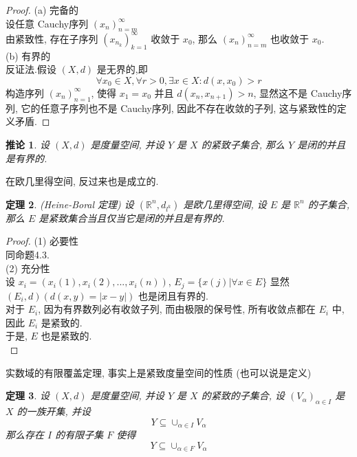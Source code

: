\documentclass[12pt, a4paper, oneside]{ctexart}
\newtheorem{theorem}{定理}[section]
\newtheorem{corollary}[theorem]{推论}
\begin{document}
\begin{proof}
    (a) 完备的\\
    设任意 Cauchy序列 $(x_n)_{n=m}^{\infty}$\\
    由紧致性, 存在子序列 $(x_{n_k})_{k=1}^{\infty}$ 收敛于 $x_0$, 那么 $(x_n)_{n=m}^{\infty}$ 也收敛于 $x_0$.\\
    (b) 有界的\\
    反证法.假设 $(X, d)$ 是无界的,即
    $$
        \forall x_0\in X, \forall r > 0,\exists x\in X:d(x, x_0)>r
    $$
    构造序列 $(x_n)_{n=1}^{\infty}$, 使得 $x_1=x_0$ 并且 $d(x_n, x_{n+1})>n$, 显然这不是 Cauchy序列, 它的任意子序列也不是 Cauchy序列, 因此不存在收敛的子列, 这与紧致性的定义矛盾.
\end{proof}

\begin{corollary}
    设 $(X, d)$ 是度量空间, 并设 $Y$ 是 $X$ 的紧致子集合, 那么 $Y$ 是闭的并且是有界的.
\end{corollary}

在欧几里得空间, 反过来也是成立的.

\begin{theorem}
    (Heine-Boral 定理) 设 $(\mathbb R^n, d_{l^k})$ 是欧几里得空间, 设 $E$ 是 $\mathbb R^n$ 的子集合, 那么 $E$ 是紧致集合当且仅当它是闭的并且是有界的. 
\end{theorem}

\begin{proof}
    (1) 必要性\\
    同命题4.3.\\
    (2) 充分性\\
    设 $x_i=(x_{i}(1),x_{i}(2),...,x_{i}(n))$, $E_j=\{x(j)|\forall x\in E\}$
    显然 $(E_i, d) (d(x,y)=|x-y|)$ 也是闭且有界的.\\
    对于 $E_i$, 因为有界数列必有收敛子列, 而由极限的保号性, 所有收敛点都在 $E_i$ 中, 因此 $E_i$ 是紧致的.\\
    于是, $E$ 也是紧致的.\\
\end{proof}

实数域的有限覆盖定理, 事实上是紧致度量空间的性质 (也可以说是定义)

\begin{theorem}
    设 $(X, d)$ 是度量空间, 并设 $Y$ 是 $X$ 的紧致的子集合, 设 $(V_{\alpha})_{\alpha\in I}$ 是 $X$ 的一族开集, 并设
    $$
        Y\subseteq \cup_{\alpha \in I} V_{\alpha}
    $$
    那么存在 $I$ 的有限子集 $F$ 使得
    $$
        Y\subseteq \cup_{\alpha\in F}V_{\alpha}
    $$
\end{theorem}
\end{document}
